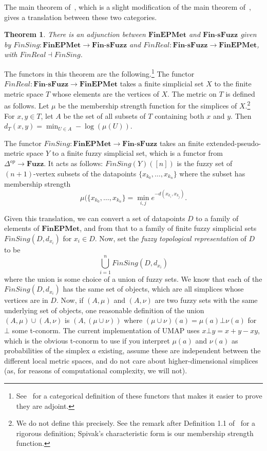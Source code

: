 \documentclass[a4paper,11pt,leqno]{article} \usepackage{amsmath}
\newtheorem*{thm}{Theorem}
\theoremstyle{definition}
\begin{document}
The main theorem of~\cite{McInnes18}, which is a slight modification of the main
theorem of~\cite{Spivak}, gives a translation between these two categories.
\begin{thm} There is an adjunction between $\textbf{FinEPMet}$ and
  $\textbf{Fin-sFuzz}$ given by $FinSing: \textbf{FinEPMet}\to
  \textbf{Fin-sFuzz}$ and $FinReal: \textbf{Fin-sFuzz}\to \textbf{FinEPMet}$,
  with $FinReal\dashv FinSing$.
\end{thm} The functors in this theorem are the
  following.\footnote{ See~\cite{McInnes18} for a categorical definition of
  these functors that makes it easier to prove they are adjoint.} The functor
  $FinReal: \textbf{Fin-sFuzz}\to\textbf{FinEPMet}$ takes a finite simplicial
  set $X$ to the finite metric space $T$ whose elements are the vertices of $X$.
  The metric on $T$ is defined as follows.
Let $\mu$ be the membership strength
  function for the simplices of $X$.\footnote{ We do not define this precisely.
  See the remark after Definition 1.1 of~\cite{Spivak} for a rigorous
  definition; Spivak's characteristic form is our membership strength function.}
  For $x, y\in T$, let $A$ be the set of all subsets of $T$ containing both $x$
  and $y$.
Then $d_T(x, y) = \min_{U\in A} -\log(\mu(U))$.

The functor $FinSing: \textbf{FinEPMet}\to \textbf{Fin-sFuzz}$ takes an finite
extended-pseudo-metric space $Y$ to a finite fuzzy simplicial set, which is
a functor from $\Delta^{op}\to \textbf{Fuzz}$.
It acts as follows:
$FinSing(Y)([n])$ is the fuzzy set of $(n+1)$-vertex subsets of the datapoints
$\{x_{k_0},\ldots,x_{k_n}\}$ where the subset has membership strength
$$\mu(\{x_{k_0},\ldots,x_{k_n}\} = \min_{i, j} e^{-d(x_{k_i}, x_{k_j})}.$$

Given this translation, we can convert a set of datapoints $D$ to a family of
elements of $\textbf{FinEPMet}$, and from that to a family of finite fuzzy
simplicial sets $FinSing(D, d_{x_i})$ for $x_i\in D$.
Now, set the \emph{fuzzy
topological representation} of $D$ to be $$\bigcup_{i=1}^n FinSing(D, d_{x_i})$$
where the union is some choice of a union of fuzzy sets.
We know that each of
the $FinSing(D, d_{x_i})$ has the same set of objects, which are all simplices
whose vertices are in $D$.
Now, if $(A, \mu)$ and $(A, \nu)$ are two fuzzy sets
with the same underlying set of objects, one reasonable definition of the union
$(A, \mu) \cup (A, \nu)$ is $(A, (\mu\cup\nu))$ where $(\mu\cup\nu)(a) = \mu(a)
\bot \nu(a)$ for $\bot$ some t-conorm.
The current implementation of UMAP uses
$x\bot y = x+y-xy$, which is the obvious t-conorm to use if you interpret
$\mu(a)$ and $\nu(a)$ as probabilities of the simplex $a$ existing, assume these
are independent between the different local metric spaces, and do not care about
higher-dimensional simplices (as, for reasons of computational complexity, we
will not).
\end{document}
